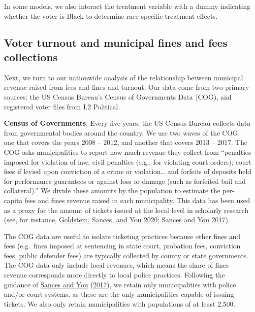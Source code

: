 \documentclass[
  12pt,
]{article}
\begin{document}
In some models, we also interact the treatment variable with a dummy indicating whether the voter is Black to determine race-specific treatment effects.

\hypertarget{voter-turnout-and-municipal-fines-and-fees-collections}{%
\subsection*{Voter turnout and municipal fines and fees collections}\label{voter-turnout-and-municipal-fines-and-fees-collections}}

Next, we turn to our nationwide analysis of the relationship between municipal revenue raised from fees and fines and turnout. Our data come from two primary sources: the US Census Bureau's Census of Governments Data (COG), and registered voter files from L2 Political.

\textbf{Census of Governments}: Every five years, the US Census Bureau collects data from governmental bodies around the country. We use two waves of the COG: one that covers the years 2008 -- 2012, and another that covers 2013 -- 2017. The COG asks municipalities to report how much revenue they collect from ``penalties imposed for violation of law; civil penalties (e.g., for violating court orders); court fees if levied upon conviction of a crime or violation\ldots{} and forfeits of deposits held for performance guarantees or against loss or damage (such as forfeited bail and collateral).'' We divide these amounts by the population to estimate the per-capita fees and fines revenue raised in each municipality. This data has been used as a proxy for the amount of tickets issued at the local level in scholarly research (see, for instance, \protect\hyperlink{ref-Goldstein2020}{Goldstein, Sances, and You 2020}; \protect\hyperlink{ref-Sances2017}{Sances and You 2017}).

The COG data are useful to isolate ticketing practices because other fines and fees (e.g.~fines imposed at sentencing in state court, probation fees, conviction fees, public defender fees) are typically collected by county or state governments. The COG data only include local revenues, which means the share of fines revenue corresponds more directly to local police practices. Following the guidance of \protect\hyperlink{ref-Sances2017}{Sances and You} (\protect\hyperlink{ref-Sances2017}{2017}), we retain only municipalities with police and/or court systems, as these are the only municipalities capable of issuing tickets. We also only retain municipalities with populations of at least 2,500.
\end{document}
